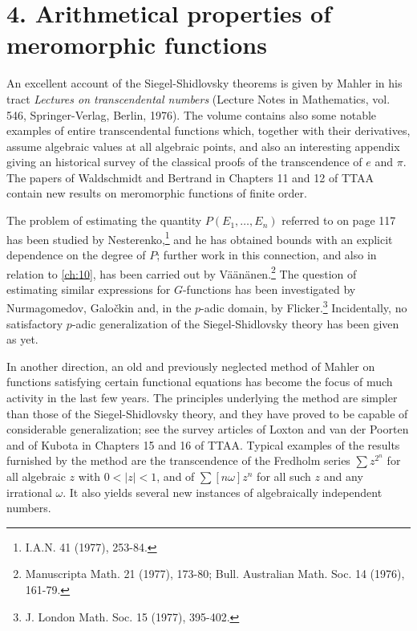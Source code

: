 \section*{4. Arithmetical properties of meromorphic functions}

An excellent account of the Siegel-Shidlovsky theorems is given by Mahler in his tract \textit{Lectures on transcendental numbers} (Lecture Notes in Mathematics, vol. 546, Springer-Verlag, Berlin, 1976). The volume contains also some notable examples of entire transcendental functions which, together with their derivatives, assume algebraic values at all algebraic points, and also an interesting appendix giving an historical survey of the classical proofs of the transcendence of \(e\) and \(\pi\). The papers of Waldschmidt and Bertrand in Chapters 11 and 12 of TTAA contain new results on meromorphic functions of finite order.

The problem of estimating the quantity \(P(E_1, \dots, E_n)\) referred to on page 117 has been studied by Nesterenko,\footnote{I.A.N. 41 (1977), 253-84.} and he has obtained bounds with an explicit dependence on the degree of \(P\); further work in this connection, and also in relation to \autoref{ch:10}, has been carried out by V{\"a}{\"a}n{\"a}nen.\footnote{Manuscripta Math. 21 (1977), 173-80; Bull. Australian Math. Soc. 14 (1976), 161-79.} The question of estimating similar expressions for \(G\)-functions has been investigated by Nurmagomedov, Galo\v{c}kin and, in the \(p\)-adic domain, by Flicker.\footnote{J. London Math. Soc. 15 (1977), 395-402.} Incidentally, no satisfactory \(p\)-adic generalization of the Siegel-Shidlovsky theory has been given as yet.

In another direction, an old and previously neglected method of Mahler on functions satisfying certain functional equations has become the focus of much activity in the last few years. The principles underlying the method are simpler than those of the Siegel-Shidlovsky theory, and they have proved to be capable of considerable generalization; see the survey articles of Loxton and van der Poorten and of Kubota in Chapters 15 and 16 of TTAA. Typical examples of the results furnished by the method are the transcendence of the Fredholm series \(\sum z^{2^n}\) for all algebraic \(z\) with \(0 < |z| < 1\), and of \(\sum [n\omega]z^n\) for all such \(z\) and any irrational \(\omega\). It also yields several new instances of algebraically independent numbers.

